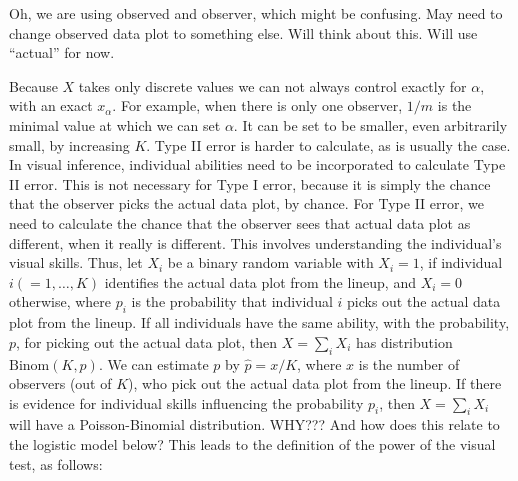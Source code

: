 \documentclass{article}
\newcommand{\green}[1]{{\color{green} #1}} %
\begin{document}
\green{Oh, we are using observed and observer, which might be confusing. May need to change observed data plot to something else. Will think about this. Will use ``actual'' for now.}

\noindent Because $X$ takes only discrete values we can not always control exactly for $\alpha$, with an exact $x_{\alpha}$. For example, when there is only one observer, $1/m$ is the minimal value at which we can set $\alpha$. It can be set to be smaller, even arbitrarily small, by increasing $K$. Type II error is harder to calculate, as is usually the case. In visual inference, individual abilities need to be incorporated to calculate Type II error. This is not necessary for Type I error, because it is simply the chance that the observer picks the actual data plot, by chance. For Type II error, we need to calculate the chance that the observer sees that actual data plot as different, when it really is different. This involves understanding the individual's visual skills. Thus, let $X_i$ be a binary random variable with $X_i = 1$, if individual $i (=1, \dots , K)$ identifies the actual data plot from the lineup, and $X_i = 0$ otherwise, where $p_i$ is the probability that individual $i$ picks out the actual data plot from the lineup. If all individuals have the same ability, with the probability, $p$, for picking out the actual data plot, then $X = \sum_i X_i$ has distribution $\text{Binom}(K, p)$. We can estimate $p$ by $\hat{p} = x/K$, where $x$ is the number of observers (out of $K$), who pick out the actual data plot from the lineup. If there is evidence for individual skills influencing the probability $p_i$, then $X = \sum_i X_i$ will have a Poisson-Binomial distribution. \green{WHY??? And how does this relate to the logistic model below?} This leads to the definition of the power of the visual test, as follows:





\end{document}
